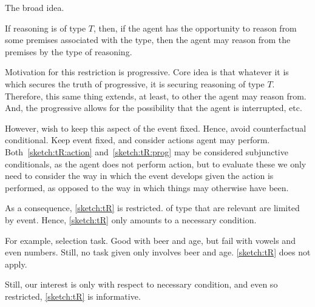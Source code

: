 \begin{note}
  The broad idea.

  If reasoning is of type \(T\), then, if the agent has the opportunity to reason from some premises associated with the type, then the agent may reason from the premises by the type of reasoning.

  Motivation for this restriction is progressive.
  Core idea is that whatever it is which secures the truth of progressive, it is securing reasoning of type \(T\).
  Therefore, this same thing extends, at least, to other  the agent may reason from.
  And, the progressive allows for the possibility that the agent is interrupted, etc.

  However, wish to keep this aspect of the event fixed.
  Hence, avoid counterfactual conditional.
  Keep event fixed, and consider actions agent may perform.
  Both~\ref{sketch:tR:action} and~\ref{sketch:tR:prog} may be considered subjunctive conditionals, as the agent does not perform action, but to evaluate these we only need to consider the way in which the event develops given the action is performed, as opposed to the way in which things may otherwise have been.

  As a consequence, \autoref{sketch:tR} is restricted.
   of type that are relevant are limited by event.
  Hence, \autoref{sketch:tR} only amounts to a necessary condition.

  For example, selection task.
  Good with beer and age, but fail with vowels and even numbers.
  Still, no task given only involves beer and age.
  \autoref{sketch:tR} does not apply.

  Still, our interest is only with respect to necessary condition, and even so restricted, \autoref{sketch:tR} is informative.
\end{note}

